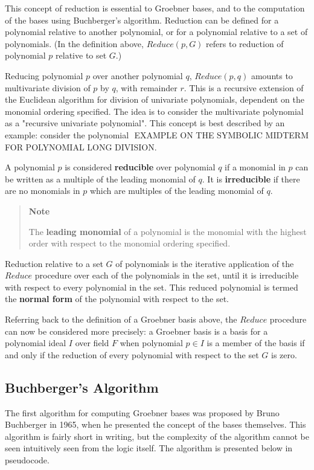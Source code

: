 \documentclass[letterpaper,12pt,titlepage,oneside,final]{book}
\newcounter{notecounter}
\newenvironment{note}{\begin{quote}%
    \refstepcounter{notecounter}%
  \textbf{Note \arabic{notecounter}}%
  \quad
}{%
\end{quote}%
}
\begin{document}
This concept of reduction is essential to Groebner bases, and to the computation of the bases using Buchberger's algorithm.  Reduction can be defined for a polynomial relative to another polynomial, or for a polynomial relative to a set of polynomials.  (In the definition above, ${Reduce( p, G)}$ refers to reduction of polynomial ${p}$ relative to set ${G}$.)  

Reducing polynomial ${p}$ over another polynomial ${q}$, ${Reduce( p, q)}$ amounts to multivariate division of ${p}$ by ${q}$, with remainder ${r}$.  This is a recursive extension of the Euclidean algorithm for division of univariate polynomials, dependent on the monomial ordering specified.  The idea is to consider the multivariate polynomial as a "recursive univariate polynomial".  This concept is best described by an example: consider the polynomial ${}$ EXAMPLE ON THE SYMBOLIC MIDTERM FOR POLYNOMIAL LONG DIVISION.

A polynomial ${p}$ is considered \textbf{reducible} over polynomial ${q}$ if a monomial in ${p}$ can be written as a multiple of the leading monomial of ${q}$.  It is \textbf{irreducible} if there are no monomials in ${p}$ which are multiples of the leading monomial of ${q}$.    

\begin{note}
  The \textbf{leading monomial} of a polynomial is the monomial with the highest order with respect to the monomial ordering specified.
\end{note}   

Reduction relative to a set ${G}$ of polynomials is the iterative application of the ${Reduce}$ procedure over each of the polynomials in the set, until it is irreducible with respect to every polynomial in the set.  This reduced polynomial is termed the \textbf{normal form} of the polynomial with respect to the set.

Referring back to the definition of a Groebner basis above, the ${Reduce}$ procedure can now be considered more precisely: a Groebner basis is a basis for a polynomial ideal ${I}$ over field ${F}$ when polynomial ${p \in I}$ is a member of the basis if and only if the reduction of every polynomial with respect to the set ${G}$ is zero.  

\subsection{Buchberger's Algorithm}

The first algorithm for computing Groebner bases was proposed by Bruno Buchberger in 1965, when he presented the concept of the bases themselves.  This algorithm is fairly short in writing, but the complexity of the algorithm cannot be seen intuitively seen from the logic itself.  The algorithm is presented below in pseudocode.
\end{document}
